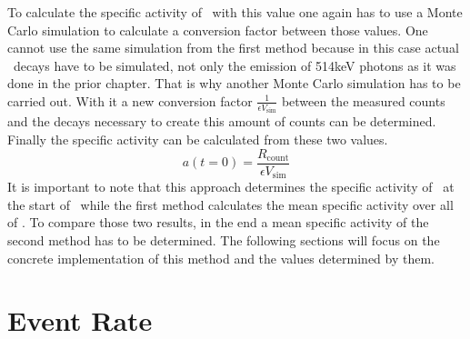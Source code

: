 \documentclass[encoding=utf8,british]{tumphthesis}
\begin{document}
To calculate the specific activity of \Kr\ with this value one again has to use a Monte Carlo simulation to calculate a conversion factor between those values. 
One cannot use the same simulation from the first method because in this case actual \Kr\ decays have to be simulated, not only the emission of 514keV photons as it was done in the prior chapter.
That is why another Monte Carlo simulation has to be carried out.
With it a new conversion factor $\frac{1}{\epsilon V_{\mathrm{sim}}}$ between the measured counts and the decays necessary to create this amount of counts can be determined.
\\

Finally the specific activity can be calculated from these two values.
\begin{equation}
a(t=0) = \frac{R_{\mathrm{count}}}{\epsilon V_{\mathrm{sim}}}
\label{equ:ActivityDieZweite}
\end{equation}
It is important to note that this approach determines the specific activity of \Kr\ at the start of \PII\ while the first method calculates the mean specific activity over all of \PII.
To compare those two results, in the end a mean specific activity of the second method has to be determined.
The following sections will focus on the concrete implementation of this method and the values determined by them.
\\

\section{Event Rate}
\label{sec:EventAct}
\end{document}
